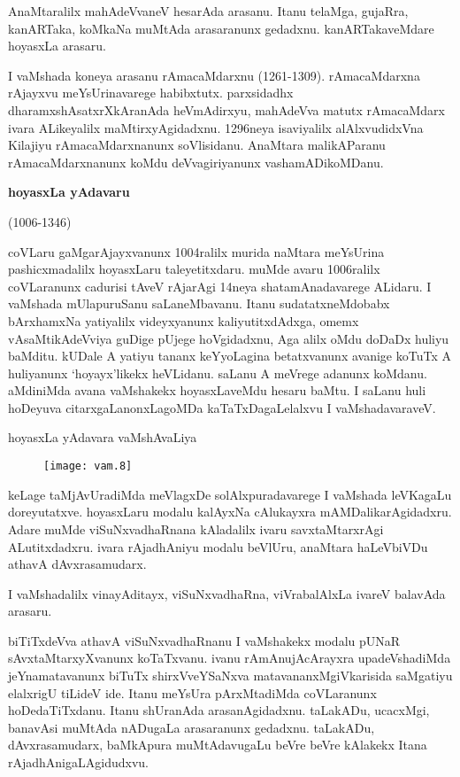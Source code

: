 \documentclass[11pt,a4size]{article}
\begin{document}
AnaMtaralilx mahAdeVvaneV hesarAda arasanu. Itanu telaMga, gujaRra,
kanARTaka, koMkaNa muMtAda arasaranunx gedadxnu. kanARTakaveMdare
hoyasxLa arasaru.

I vaMshada koneya arasanu rAmacaMdarxnu (1261-1309). rAmacaMdarxna
rAjayxvu meYsUrinavarege habibxtutx. parxsidadhx
dharamxshAsatxrXkAranAda heVmAdirxyu, mahAdeVva matutx rAmacaMdarx
ivara ALikeyalilx maMtirxyAgidadxnu. 1296neya isaviyalilx
alAlxvudidxVna Kilajiyu rAmacaMdarxnanunx soVlisidanu. AnaMtara
malikAParanu rAmacaMdarxnanunx koMdu deVvagiriyanunx vashamADikoMDanu.

\begin{center}
\textbf{\Large hoyasxLa yAdavaru}

(1006-1346)
\end{center}

coVLaru gaMgarAjayxvanunx 1004ralilx murida naMtara meYsUrina
pashicxmadalilx hoyasxLaru taleyetitxdaru. muMde avaru 1006ralilx
coVLaranunx cadurisi tAveV rAjarAgi 14neya shatamAnadavarege
ALidaru. I vaMshada mUlapuruSanu saLaneMbavanu. Itanu
sudatatxneMdobabx bArxhamxNa yatiyalilx videyxyanunx kaliyutitxdAdxga,
omemx vAsaMtikAdeVviya guDige pUjege hoVgidadxnu, Aga alilx oMdu
doDaDx huliyu baMditu. kUDale A yatiyu tananx keYyoLagina betatxvanunx
avanige koTuTx A huliyanunx `hoyayx'likekx heVLidanu. saLanu A meVrege
adanunx koMdanu. aMdiniMda avana vaMshakekx hoyasxLaveMdu hesaru
baMtu. I saLanu huli hoDeyuva citarxgaLanonxLagoMDa kaTaTxDagaLelalxvu
I vaMshadavaraveV.

\bigskip

\centerline{hoyasxLa yAdavara vaMshAvaLiya}
\bigskip

\begin{figure}[H]
\centering
\texttt{[image: vam.8]} 
\end{figure}



keLage taMjAvUradiMda meVlagxDe solAlxpuradavarege I vaMshada
leVKagaLu doreyutatxve. hoyasxLaru modalu kalAyxNa cAlukayxra
mAMDalikarAgidadxru. Adare muMde viSuNxvadhaRnana kAladalilx ivaru
savxtaMtarxrAgi ALutitxdadxru. ivara rAjadhAniyu modalu beVlUru,
anaMtara haLeVbiVDu athavA dAvxrasamudarx.

I vaMshadalilx vinayAditayx, viSuNxvadhaRna, viVrabalAlxLa ivareV
balavAda arasaru.

biTiTxdeVva athavA viSuNxvadhaRnanu I vaMshakekx modalu pUNaR
sAvxtaMtarxyXvanunx koTaTxvanu. ivanu rAmAnujAcArayxra upadeVshadiMda
jeYnamatavanunx biTuTx shirxVveYSaNxva matavananxMgiVkarisida
saMgatiyu elalxrigU tiLideV ide. Itanu meYsUra pArxMtadiMda
coVLaranunx hoDedaTiTxdanu. Itanu shUranAda arasanAgidadxnu. taLakADu,
ucacxMgi, banavAsi muMtAda nADugaLa arasaranunx gedadxnu. taLakADu,
dAvxrasamudarx, baMkApura muMtAdavugaLu beVre beVre kAlakekx Itana
rAjadhAnigaLAgidudxvu.
\end{document}
